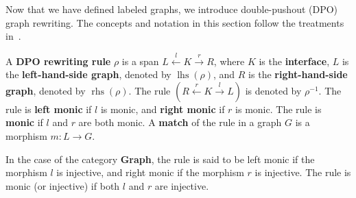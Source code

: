 Now that we have defined labeled graphs, we introduce double-pushout (DPO) graph rewriting. The concepts and notation in this section follow the treatments in~\cite{endrullis2024generalized_icgt}.
\begin{definition} 
  \label{def:grs:dpo_rule}
A \textbf{DPO rewriting rule} $\rho$ is a span \( L \overset{l}{\leftarrow} K \overset{r}{\rightarrow} R \), where \( K \) is the \textbf{interface}, \( L \) is the \textbf{left-hand-side graph}, denoted by \( \operatorname{lhs}(\rho) \), and \( R \) is the \textbf{right-hand-side graph}, denoted by \( \operatorname{rhs}(\rho) \). The rule $(R \overset{r}{\leftarrow} K \overset{l}{\rightarrow} L)$ is denoted by $\rho^{-1}$. The rule is \textbf{left monic} if \( l \) is monic, and \textbf{right monic} if \( r \) is monic. 
The rule is \textbf{monic} if $l$ and $r$ are both monic.
A \textbf{match} of the rule in a graph \( G \) is a morphism \( m: L \rightarrow G \). 
\end{definition}
In the case of the category \textbf{Graph}, the rule is said to be left monic if the morphism \( l \) is injective, and right monic if the morphism \( r \) is injective. The rule is monic (or injective) if both \( l \) and \( r \) are injective.

